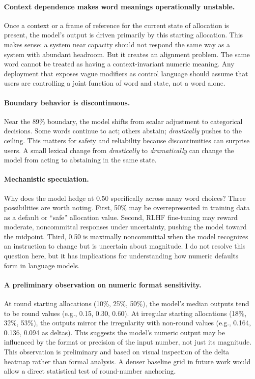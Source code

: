 \documentclass[11pt]{article}
\begin{document}
\paragraph{Context dependence makes word meanings operationally unstable.}
Once a context or a frame of reference for the current state of allocation is present, the model's output is driven primarily by this starting allocation. This makes sense: a system near capacity should not respond the same way as a system with abundant headroom. But it creates an alignment problem. The same word cannot be treated as having a context-invariant numeric meaning. Any deployment that exposes vague modifiers as control language should assume that users are controlling a joint function of word and state, not a word alone.

\paragraph{Boundary behavior is discontinuous.}
Near the 89\% boundary, the model shifts from scalar adjustment to categorical decisions. Some words continue to act; others abstain; \textit{drastically} pushes to the ceiling. This matters for safety and reliability because discontinuities can surprise users. A small lexical change from \textit{drastically} to \textit{dramatically} can change the model from acting to abstaining in the same state.

\paragraph{Mechanistic speculation.}
Why does the model hedge at 0.50 specifically across many word choices? Three possibilities are worth noting. First, 50\% may be overrepresented in training data as a default or ``safe'' allocation value. Second, RLHF fine-tuning may reward moderate, noncommittal responses under uncertainty, pushing the model toward the midpoint. Third, 0.50 is maximally noncommittal when the model recognizes an instruction to change but is uncertain about magnitude. I do not resolve this question here, but it has implications for understanding how numeric defaults form in language models.

\paragraph{A preliminary observation on numeric format sensitivity.}
At round starting allocations (10\%, 25\%, 50\%), the model's median outputs tend to be round values (e.g., 0.15, 0.30, 0.60). At irregular starting allocations (18\%, 32\%, 53\%), the outputs mirror the irregularity with non-round values (e.g., 0.164, 0.136, 0.094 as deltas). This suggests the model's numeric output may be influenced by the format or precision of the input number, not just its magnitude. This observation is preliminary and based on visual inspection of the delta heatmap rather than formal analysis. A denser baseline grid in future work would allow a direct statistical test of round-number anchoring.
\end{document}
